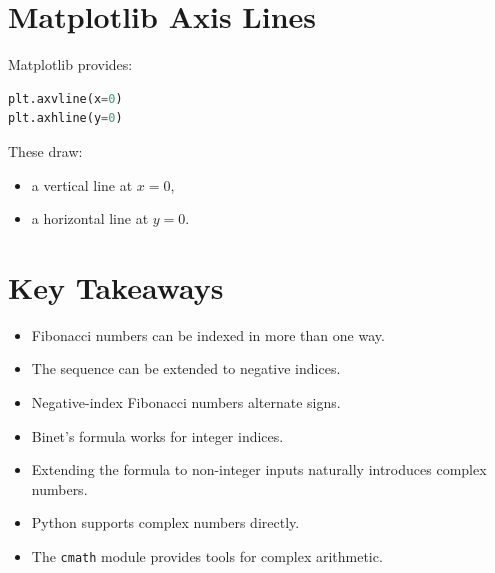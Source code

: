 \documentclass[11pt]{article}
\begin{document}
\section{Matplotlib Axis Lines}

Matplotlib provides:

\begin{lstlisting}[language=Python]
plt.axvline(x=0)
plt.axhline(y=0)
\end{lstlisting}

These draw:

\begin{itemize}
    \item a vertical line at \(x=0\),
    \item a horizontal line at \(y=0\).
\end{itemize}

\section{Key Takeaways}

\begin{itemize}
    \item Fibonacci numbers can be indexed in more than one way.
    \item The sequence can be extended to negative indices.
    \item Negative-index Fibonacci numbers alternate signs.
    \item Binet's formula works for integer indices.
    \item Extending the formula to non-integer inputs naturally introduces complex numbers.
    \item Python supports complex numbers directly.
    \item The \texttt{cmath} module provides tools for complex arithmetic.
\end{itemize}
\end{document}
